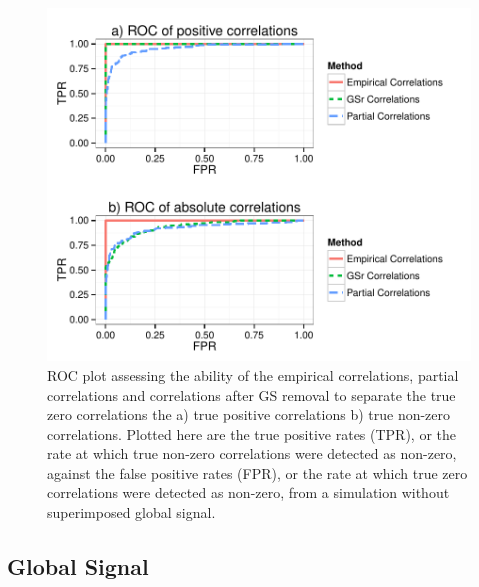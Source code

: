 \documentclass[a4paper]{article}\usepackage[]{graphicx}\usepackage[]{color}
\makeatletter
\def\maxwidth{ %
  \ifdim\Gin@nat@width>\linewidth
    \linewidth
  \else
    \Gin@nat@width
  \fi
}
\newenvironment{knitrout}{}{} %
\makeatother
\begin{document}
\begin{knitrout}
\color{fgcolor}\begin{figure}[]


{\centering \includegraphics[width=\maxwidth]{GSFigs/GSROCnoGS} 

}

\caption[ROC plot assessing the ability of the empirical correlations, partial correlations and correlations after GS removal to separate the true zero correlations the a) true positive correlations b) true non-zero correlations]{ROC plot assessing the ability of the empirical correlations, partial correlations and correlations after GS removal to separate the true zero correlations the a) true positive correlations b) true non-zero correlations. Plotted here are the true positive rates (TPR), or the rate at which true non-zero correlations were detected as non-zero, against the false positive rates (FPR), or the rate at which true zero correlations were detected as non-zero, from a simulation without superimposed global signal.\label{fig:ROCnoGS}}
\end{figure}


\end{knitrout}






\clearpage
\subsection{Global Signal}
\end{document}
